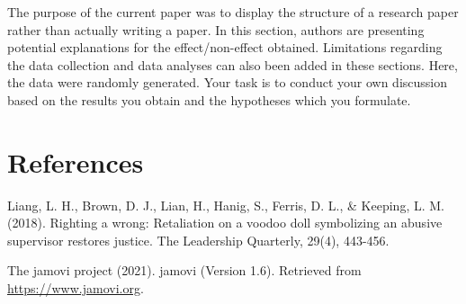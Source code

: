 \documentclass[
]{article}
\begin{document}
The purpose of the current paper was to display the structure of a
research paper rather than actually writing a paper. In this section,
authors are presenting potential explanations for the effect/non-effect
obtained. Limitations regarding the data collection and data analyses
can also been added in these sections. Here, the data were randomly
generated. Your task is to conduct your own discussion based on the
results you obtain and the hypotheses which you formulate.

\hypertarget{references}{%
\section{References}\label{references}}

Liang, L. H., Brown, D. J., Lian, H., Hanig, S., Ferris, D. L., \&
Keeping, L. M. (2018). Righting a wrong: Retaliation on a voodoo doll
symbolizing an abusive supervisor restores justice. The Leadership
Quarterly, 29(4), 443-456.

The jamovi project (2021). jamovi (Version 1.6). Retrieved from
\url{https://www.jamovi.org}.
\end{document}
